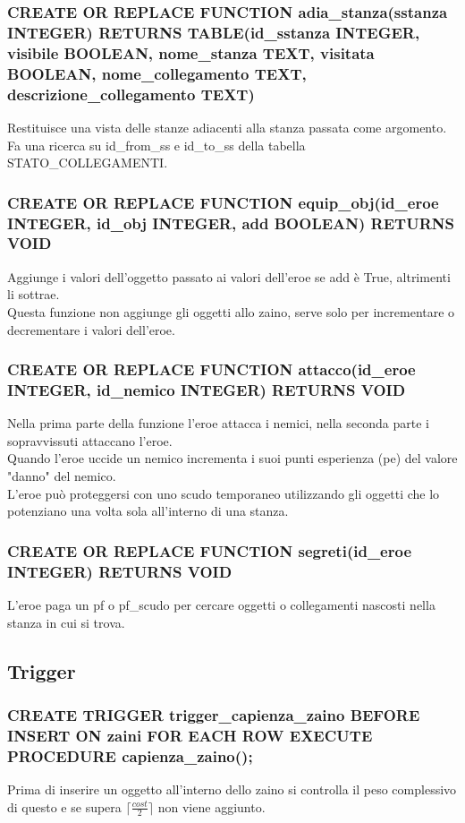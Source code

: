 \documentclass[11pt]{article}
\newcommand\ceil[1]{\lceil#1\rceil}
\begin{document}
\subsubsection{CREATE OR REPLACE FUNCTION adia\_stanza(sstanza INTEGER) RETURNS TABLE(id\_sstanza INTEGER, visibile BOOLEAN, nome\_stanza TEXT, visitata BOOLEAN, nome\_collegamento TEXT, descrizione\_collegamento TEXT)}
Restituisce una vista delle stanze adiacenti alla stanza passata come argomento.\\
Fa una ricerca su id\_from\_ss e id\_to\_ss della tabella STATO\_COLLEGAMENTI.
\subsubsection{CREATE OR REPLACE FUNCTION equip\_obj(id\_eroe INTEGER, id\_obj INTEGER, add BOOLEAN) RETURNS VOID}
Aggiunge i valori dell'oggetto passato ai valori dell'eroe se add è True, altrimenti li sottrae.\\
Questa funzione non aggiunge gli oggetti allo zaino, serve solo per incrementare o decrementare i valori dell'eroe.
\subsubsection{CREATE OR REPLACE FUNCTION attacco(id\_eroe INTEGER, id\_nemico INTEGER) RETURNS VOID}
Nella prima parte della funzione l'eroe attacca i nemici, nella seconda parte i sopravvissuti attaccano l'eroe.\\
Quando l'eroe uccide un nemico incrementa i suoi punti esperienza (pe) del valore "danno" del nemico.\\
L'eroe può proteggersi con uno scudo temporaneo utilizzando gli oggetti che lo potenziano una volta sola all'interno di una stanza.
\subsubsection{CREATE OR REPLACE FUNCTION segreti(id\_eroe INTEGER) RETURNS VOID}
L'eroe paga un pf o pf\_scudo per cercare oggetti o collegamenti nascosti nella stanza in cui si trova.
\subsection{Trigger}
\subsubsection{CREATE TRIGGER trigger\_capienza\_zaino BEFORE INSERT ON zaini FOR EACH ROW EXECUTE PROCEDURE capienza\_zaino();}
Prima di inserire un oggetto all'interno dello zaino si controlla il peso complessivo di questo e se supera $ \ceil{\frac{cost}{2}} $ non viene aggiunto.
\end{document}
